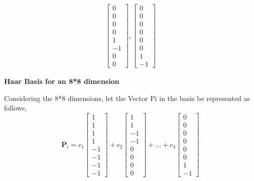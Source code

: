 \documentclass{article}
\begin{document}
\begin{align*}
\begin{bmatrix} 0 \\ 0 \\ 0 \\ 0 \\ 1 \\ -1 \\ 0 \\ 0 \end{bmatrix},
\begin{bmatrix} 0 \\ 0 \\ 0 \\ 0 \\ 0 \\ 0 \\ 1 \\ -1 \end{bmatrix}
\end{align*}


\begin{center}
  \small\textbf{Haar Basis for an 8*8 dimension} \linebreak
\end{center}


\setlength{\parindent}{0pt}
Considering the 8*8 dimensions, let the Vector Pi in the basis be represented as follows,
\[
\mathbf{P}_i = c_1\begin{bmatrix} 1 \\ 1 \\ 1 \\ 1 \\ -1 \\ -1 \\ -1 \\ -1 \end{bmatrix} + c_2\begin{bmatrix} 1 \\ 1 \\ -1 \\ -1 \\ 0 \\ 0 \\ 0 \\ 0 \end{bmatrix} + \ldots + c_3\begin{bmatrix} 0 \\ 0 \\ 0 \\ 0 \\ 0 \\ 0 \\ 1 \\ -1 \end{bmatrix}
\]
\end{document}
